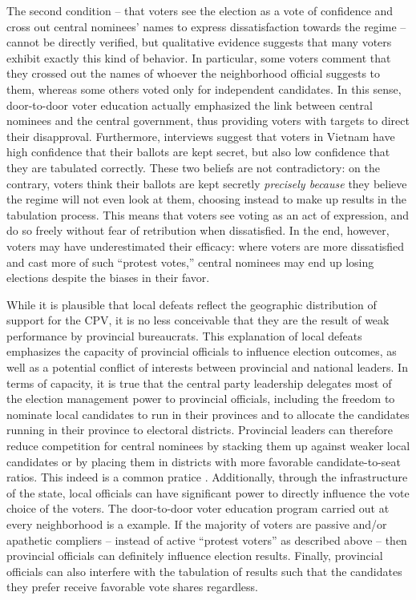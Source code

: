 \documentclass[12pt]{article}\usepackage[]{graphicx}\usepackage[]{color}
\newcommand{\1}{\mathbbm{1}}
\begin{document}
The second condition -- that voters see the election as a vote of confidence and cross out central nominees' names to express dissatisfaction towards the regime -- cannot be directly verified, but qualitative evidence suggests that many voters exhibit exactly this kind of behavior. In particular, some voters comment that they crossed out the names of whoever the neighborhood official suggests to them, whereas some others voted only for independent candidates. In this sense, door-to-door voter education actually emphasized the link between central nominees and the central government, thus providing voters with targets to direct their disapproval. Furthermore, interviews suggest that voters in Vietnam have high confidence that their ballots are kept secret, but also low confidence that they are tabulated correctly. These two beliefs are not contradictory: on the contrary, voters think their ballots are kept secretly \textit{precisely because} they believe the regime will not even look at them, choosing instead to make up results in the tabulation process. This means that voters see voting as an act of expression, and do so freely without fear of retribution when dissatisfied. In the end, however, voters may have underestimated their efficacy: where voters are more dissatisfied and cast more of such ``protest votes,'' central nominees may end up losing elections despite the biases in their favor.

While it is plausible that local defeats reflect the geographic distribution of support for the CPV, it is no less conceivable that they are the result of weak performance by provincial bureaucrats. This explanation of local defeats emphasizes the capacity of provincial officials to influence election outcomes, as well as a potential conflict of interests between provincial and national leaders. In terms of capacity, it is true that the central party leadership delegates most of the election management power to provincial officials, including the freedom to nominate local candidates to run in their provinces and to allocate the candidates running in their province to electoral districts. Provincial leaders can therefore reduce competition for central nominees by stacking them up against weaker local candidates or by placing them in districts with more favorable candidate-to-seat ratios. This indeed is a common pratice \cite[provided evidence for the 2007 election, which I replicated successfully for the 2011 and 2016 elections]{MaleskySchuler2011}.  Additionally, through the infrastructure of the state, local officials can have significant power to directly influence the vote choice of the voters. The door-to-door voter education program carried out at every neighborhood is a example. If the majority of voters are passive and/or apathetic compliers -- instead of active ``protest voters'' as described above -- then provincial officials can definitely influence election results. Finally, provincial officials can also interfere with the tabulation of results such that the candidates they prefer receive favorable vote shares regardless. 
\end{document}
